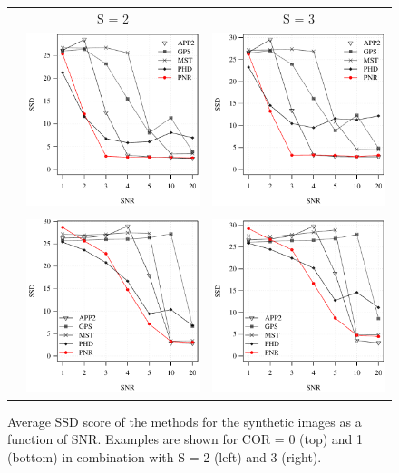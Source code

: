 \begin{figure}
	\centering\tiny
	\begin{tabular}{ccc}%
		& \hspace{3.5em}S = 2 & \hspace{3.5em}S = 3 \\[0.5em]
		\rotatebox{90}{\hspace{0.5em}COR = 0} &
		\includegraphics[align=c,width=0.25\columnwidth]{fig7a} &
		\includegraphics[align=c,width=0.25\columnwidth]{fig7b} \\
		\\[0.01\columnwidth]
		\rotatebox{90}{\hspace{0.5em}COR = 1} &
		\includegraphics[align=c,width=0.25\columnwidth]{fig7c} &
		\includegraphics[align=c,width=0.25\columnwidth]{fig7d}
	\end{tabular}
	\caption{Average SSD score of the methods for the synthetic images as a function of SNR. Examples are shown for COR = 0 (top) and 1 (bottom) in combination with S = 2 (left) and 3 (right).}
	\label{fig7}
\end{figure}


